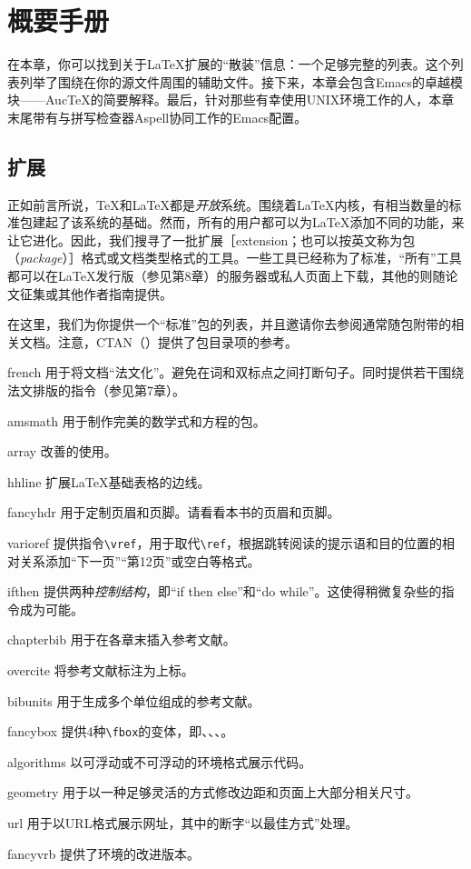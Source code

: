 \chapter{概要手册}

在本章，你可以找到关于\LaTeX 扩展的“散装”信息：一个足够完整的列表。这个列表列举了围绕在你的源文件周围的辅助文件。接下来，本章会包含\textsf{Emacs}的卓越模块——Auc\TeX 的简要解释。最后，针对那些有幸使用UNIX环境工作的人，本章末尾带有与拼写检查器\textsf{Aspell}协同工作的\textsf{Emacs}配置。

\section{扩展}

正如前言所说，\TeX 和\LaTeX 都是\emph{开放}系统。围绕着\LaTeX 内核，有相当数量的标准包建起了该系统的基础。然而，所有的用户都可以为\LaTeX 添加不同的功能，来让它进化。因此，我们搜寻了一批扩展［extension；也可以按英文称为包（\emph{package}）］格式或文档类型格式的工具。一些工具已经称为了标准，“所有”工具都可以在\LaTeX 发行版（参见第8章）的服务器或私人页面上下载，其他的则随论文征集或其他作者指南提供。

在这里，我们为你提供一个“标准”包的列表，并且邀请你去参阅通常随包附带的相关文档。注意，CTAN（）提供了包目录项的参考。
\begin{packages}
    \item[french]用于将文档“法文化”。避免在词和双标点之间打断句子。同时提供若干围绕法文排版的指令（参见第7章）。
    \item[amsmath]用于制作完美的数学式和方程的包。
    \item[array]改善的使用。
    \item[hhline]扩展\LaTeX 基础表格的边线。
    \item[fancyhdr]用于定制页眉和页脚。请看看本书的页眉和页脚。
    \item[varioref]提供指令\verb+\vref+，用于取代\verb+\ref+，根据跳转阅读的提示语和目的位置的相对关系添加“下一页”“第12页”或空白等格式。
    \item[ifthen]提供两种\emph{控制结构}，即“if then else”和“do while”。这使得稍微复杂些的指令成为可能。
    \item[chapterbib]用于在各章末插入参考文献。
    \item[overcite]将参考文献标注为上标。
    \item[bibunits]用于生成多个单位组成的参考文献。
    \item[fancybox]提供4种\verb+\fbox+的变体，即\shadowbox{\verb+\shadowbox+}、\doublebox{\verb+\doublebox+}、\ovalbox{\verb+\ovalbox+}、\Ovalbox{\verb+\Ovalbox+}。
    \item[algorithms]以可浮动或不可浮动的环境格式展示代码。
    \item[geometry]用于以一种足够灵活的方式修改边距和页面上大部分相关尺寸。
    \item[url]用于以URL格式展示网址，其中的断字“以最佳方式”处理。
    \item[fancyvrb]提供了环境的改进版本。
\end{packages}

